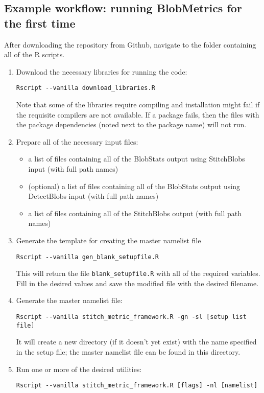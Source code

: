\documentclass{article}
\begin{document}
\subsection{Example workflow: running BlobMetrics for the first time}

After downloading the repository from Github, navigate to the folder containing all of the R scripts. 
\begin{enumerate}
\item Download the necessary libraries for running the code:
\begin{verbatim}
Rscript --vanilla download_libraries.R
\end{verbatim}

Note that some of the libraries require compiling and installation might fail if the requisite compilers are not available. If a package fails, then the files with the package dependencies (noted next to the package name) will not run. 
\item Prepare all of the necessary input files:
\begin{itemize}
\item a list of files containing all of the BlobStats output using StitchBlobs input (with full path names)
\item (optional) a list of files containing all of the BlobStats output using DetectBlobs input (with full path names)
\item a list of files containing all of the StitchBlobs output (with full path names)
\end{itemize}
\item Generate the template for creating the master namelist file
\begin{verbatim}
Rscript --vanilla gen_blank_setupfile.R
\end{verbatim}

This will return the file \texttt{blank\_setupfile.R} with all of the required variables. Fill in the desired values and save the modified file with the desired filename.
\item Generate the master namelist file:
\begin{verbatim}
Rscript --vanilla stitch_metric_framework.R -gn -sl [setup list file]
\end{verbatim}

It will create a new directory (if it doesn't yet exist) with the name specified in the setup file; the master namelist file can be found in this directory. 
\item Run one or more of the desired utilities:
\begin{verbatim}
Rscript --vanilla stitch_metric_framework.R [flags] -nl [namelist]
\end{verbatim}
\end{enumerate}
\end{document}

